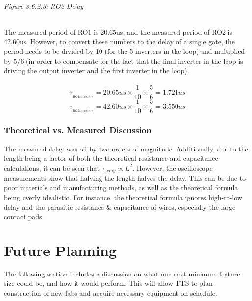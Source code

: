 \documentclass[12pt]{article}
\begin{document}
\begin{center}
\\\emph{Figure 3.6.2.3: RO2 Delay}
\end{center}
\\
The measured period of RO1 is 20.65us, and the measured period of RO2 is 42.60us. However, to convert these numbers to the delay of a single gate, the period needs to be divided by 10 (for the 5 inverters in the loop) and multiplied by 5/6 (in order to compensate for the fact that the final inverter in the loop is driving the output inverter and the first inverter in the loop).
\\
\\\[\tau _{_{RO1 inverters}} = 20.65us \times \frac{1}{10} \times \frac{5}{6} = 1.721us\]
\[\tau _{_{RO2 inverters}} = 42.60us \times \frac{1}{10} \times \frac{5}{6} = 3.550us\]

\subsubsection{Theoretical vs. Measured Discussion}
The measured delay was off by two orders of magnitude. Additionally, due to the length being a factor of both the theoretical resistance and capacitance calculations, it can be seen that $\tau_{_delay} \propto L^2$. However, the oscilloscope measurements show that halving the length halves the delay. This can be due to poor materials and manufacturing methods, as well as the theoretical formula being overly idealistic. For instance, the theoretical formula ignores high-to-low delay and the parasitic resistance \& capacitance of wires, especially the large contact pads.

\pagebreak

\section{Future Planning}
The following section includes a discussion on what our next minimum feature size could be, and how it would perform. This will allow TTS to plan construction of new fabs and acquire necessary equipment on schedule.
\end{document}
